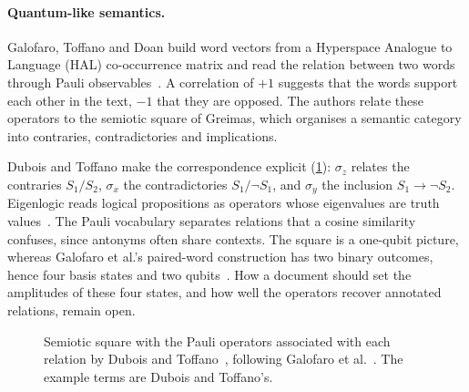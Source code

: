 \documentclass[11pt,a4paper]{article}
\begin{document}
\paragraph{Quantum-like semantics.}
Galofaro, Toffano and Doan build word vectors from a Hyperspace Analogue to Language (HAL) co-occurrence matrix and read the relation between two words through Pauli observables~\cite{galofaro2018}. A correlation of $+1$ suggests that the words support each other in the text, $-1$ that they are opposed. The authors relate these operators to the semiotic square of Greimas, which organises a semantic category into contraries, contradictories and implications.

Dubois and Toffano make the correspondence explicit (\cref{fig:square}): $\sigma_z$ relates the contraries $S_1/S_2$, $\sigma_x$ the contradictories $S_1/\neg S_1$, and $\sigma_y$ the inclusion $S_1\to\neg S_2$. Eigenlogic reads logical propositions as operators whose eigenvalues are truth values~\cite{dubois2026,toffano2020}. The Pauli vocabulary separates relations that a cosine similarity confuses, since antonyms often share contexts. The square is a one-qubit picture, whereas Galofaro et al.'s paired-word construction has two binary outcomes, hence four basis states and two qubits~\cite{galofaro2018}. How a document should set the amplitudes of these four states, and how well the operators recover annotated relations, remain open.

\begin{figure}[!tb]
  \centering
  \caption{Semiotic square with the Pauli operators associated with each relation by Dubois and Toffano~\cite{dubois2026}, following Galofaro et al.~\cite{galofaro2018}. The example terms are Dubois and Toffano's.}
  \label{fig:square}
\end{figure}
\end{document}
